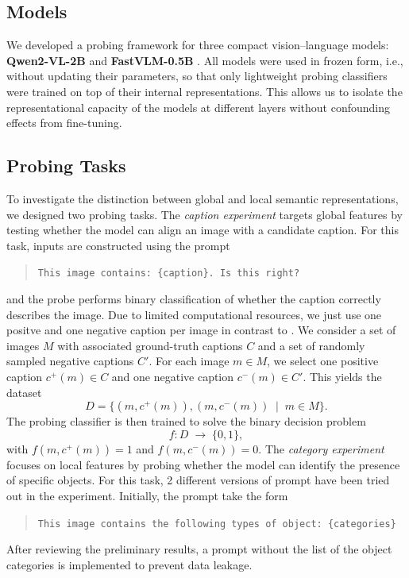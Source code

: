\documentclass[11pt]{article}
\begin{document}
\subsection{Models}
We developed a probing framework for three compact vision--language models:
\textbf{Qwen2-VL-2B} \cite{qwen2vl2024} and \textbf{FastVLM-0.5B} \cite{fastvlm2025}.
All models were used in frozen form, i.e., without updating their parameters,
so that only lightweight probing classifiers were trained on top of their internal
representations. This allows us to isolate the representational capacity of the models
at different layers without confounding effects from fine-tuning.

\subsection{Probing Tasks}
To investigate the distinction between global and local semantic representations,
we designed two probing tasks. The \emph{caption experiment} targets global features
by testing whether the model can align an image with a candidate caption.
For this task, inputs are constructed using the prompt
\begin{quote}
\texttt{This image contains: \{caption\}. Is this right?}
\end{quote}
and the probe performs binary classification of whether the caption correctly describes the image. Due to limited computational resources, we just use one positve and one negative caption per image in contrast to \cite{tao2024probingmultimodallargelanguage}.
We consider a set of images $M$ with associated ground-truth captions $C$
and a set of randomly sampled negative captions $C'$.
For each image $m \in M$, we select one positive caption $c^+(m) \in C$
and one negative caption $c^-(m) \in C'$.
This yields the dataset
\[
D = \{(m, c^+(m)), (m, c^-(m)) \;\mid\; m \in M\}.
\]
The probing classifier is then trained to solve the binary decision problem
\[
f : D \;\rightarrow\; \{0,1\},
\]
with $f(m, c^+(m)) = 1$ and $f(m, c^-(m)) = 0$.
The \emph{category experiment} focuses on local features by probing whether the model
can identify the presence of specific objects. For this task, 2 different versions of prompt have been tried out in the experiment.
Initially, the prompt take the form
\begin{quote}
\texttt{This image contains the following types of object: \{categories\}}
\end{quote}
After reviewing the preliminary results, a prompt without the list of the object categories is implemented to prevent data leakage.
\end{document}
